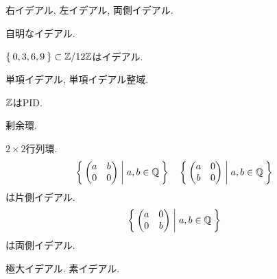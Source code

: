   \subsection{}
  \begin{definition}
    右イデアル, 左イデアル, 両側イデアル.
  \end{definition}
  \begin{example}
    自明なイデアル.
  \end{example}
  \begin{example}
    $\Set{0,3,6,9}\subset\mathbb{Z}/12\mathbb{Z}$はイデアル.
  \end{example}
  \begin{definition}
    単項イデアル, 単項イデアル整域.
  \end{definition}
  \begin{example}
    $\mathbb{Z}$はPID.
  \end{example}
  \begin{definition}
    剰余環.
  \end{definition}
  \begin{example}
    $2\times 2$行列環.
    \begin{align*}
      &\Set{\begin{pmatrix}a&b\\0&0\end{pmatrix}|a,b\in \mathbb{Q}}
      &&\Set{\begin{pmatrix}a&0\\b&0\end{pmatrix}|a,b\in \mathbb{Q}}
    \end{align*}
    は片側イデアル.
    \begin{align*}
      &\Set{\begin{pmatrix}a&0\\0&b\end{pmatrix}|a,b\in \mathbb{Q}}
    \end{align*}
    は両側イデアル.
  \end{example}
  \begin{definition}
    極大イデアル. 素イデアル.
  \end{definition}
